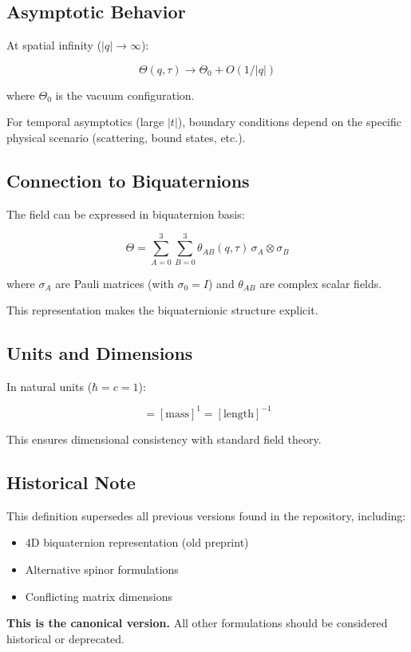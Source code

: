\subsection{Asymptotic Behavior}

At spatial infinity ($|q| \to \infty$):

\begin{equation}
\label{eq:canonical:theta_asymptotics}
\Theta(q,\tau) \to \Theta_0 + O(1/|q|)
\end{equation}

\noindent where $\Theta_0$ is the vacuum configuration.

For temporal asymptotics (large $|t|$), boundary conditions depend on the specific physical scenario (scattering, bound states, etc.).

\subsection{Connection to Biquaternions}

The field can be expressed in biquaternion basis:

\begin{equation}
\label{eq:canonical:theta_biquaternion}
\Theta = \sum_{A=0}^{3} \sum_{B=0}^{3} \theta_{AB}(q,\tau) \, \sigma_A \otimes \sigma_B
\end{equation}

\noindent where $\sigma_A$ are Pauli matrices (with $\sigma_0 = I$) and $\theta_{AB}$ are complex scalar fields.

This representation makes the biquaternionic structure explicit.

\subsection{Units and Dimensions}

In natural units ($\hbar = c = 1$):

\begin{equation}
[\Theta] = [\text{mass}]^1 = [\text{length}]^{-1}
\end{equation}

This ensures dimensional consistency with standard field theory.

\subsection{Historical Note}

This definition supersedes all previous versions found in the repository, including:
\begin{itemize}
    \item 4D biquaternion representation (old preprint)
    \item Alternative spinor formulations
    \item Conflicting matrix dimensions
\end{itemize}

\textbf{This is the canonical version.} All other formulations should be considered historical or deprecated.

